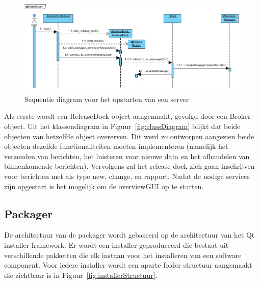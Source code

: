\begin{figure}
\includegraphics[width=\textwidth,height=\textheight,keepaspectratio]{afbeelding/seqStartServer.png}
\centering
\caption{Sequentie diagram voor het opstarten van een server}
\label{fig:seqStartServer}
\end{figure}

Als eerste wordt een ReleaseDock object aangemaakt, gevolgd door een Broker object.
Uit het klassendiagram in Figuur~\ref{fig:classDiagram} blijkt dat beide objecten van hetzelfde object overerven.
Dit werd zo ontworpen aangezien beide objecten dezelfde functionaliteiten moeten implementeren (namelijk het verzenden van berichten, het luisteren voor nieuwe data en het afhandelen van binnenkomende berichten).
Vervolgens zal het release dock zich gaan inschrijven voor berichten met als type new, change, en rapport.
Nadat de nodige services zijn opgestart is het mogelijk om de overviewGUI op te starten.

\subsection{Packager}
De architectuur van de packager wordt gebaseerd op de architectuur van het Qt installer framework.
Er wordt een installer geproduceerd die bestaat uit verschillende pakketten die elk instaan voor het installeren van een software component.
Voor iedere installer wordt een aparte folder structuur aangemaakt die zichtbaar is in Figuur~\ref{fig:installerStructuur}.

